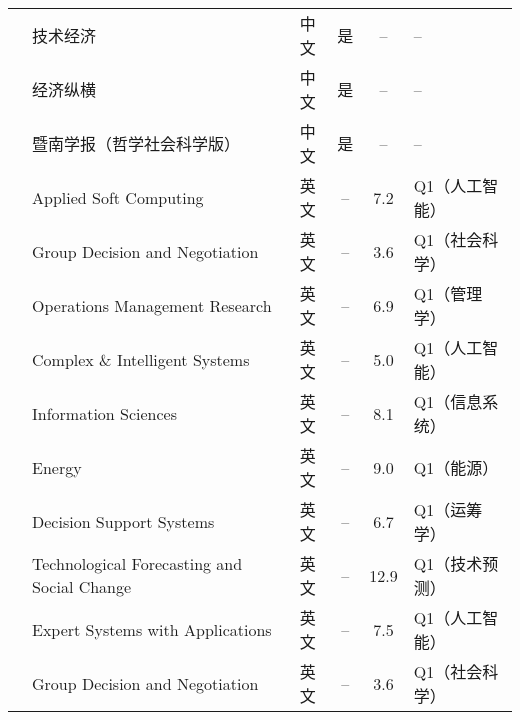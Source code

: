\documentclass[nonblindrev]{write_paper}
\begin{document}
\begin{table}[htbp]
\begin{tabular}{p{1cm}p{7cm}cccl}
\cite{吴继飞2024中国新质生产力发展水平测度、区域差距及动态规律} & 技术经济 & 中文 & 是 & -- & -- \\
\cite{乔晓楠2024新质生产力发展的分析框架：理论机理、测度方法与经验证据} & 经济纵横 & 中文 & 是 & -- & -- \\
\cite{张龙2024新质生产力的原创价值、统计测度与培育方向} & 暨南学报（哲学社会科学版） & 中文 & 是 & -- & -- \\
\cite{ataeiOrdinalPriorityApproach2020} & Applied Soft Computing & 英文 & -- & 7.2 & Q1（人工智能） \\
\cite{mahmoudi2023intervalopa} & Group Decision and Negotiation & 英文 & -- & 3.6 & Q1（社会科学） \\
\cite{mahmoudi2022fuzzyopa} & Operations Management Research & 英文 & -- & 6.9 & Q1（管理学） \\
\cite{abdelbasset2022opa} & Complex \& Intelligent Systems & 英文 & -- & 5.0 & Q1（人工智能） \\
\cite{wang2024popa} & Information Sciences & 英文 & -- & 8.1 & Q1（信息系统） \\
\cite{cui2025carbonopa} & Energy & 英文 & -- & 9.0 & Q1（能源） \\
\cite{pamucar2023opa} & Decision Support Systems & 英文 & -- & 6.7 & Q1（运筹学） \\
\cite{pamucar2022raaopa} & Technological Forecasting and Social Change & 英文 & -- & 12.9 & Q1（技术预测） \\
\cite{mahmoudi2022ropa} & Expert Systems with Applications & 英文 & -- & 7.5 & Q1（人工智能） \\
\cite{mahmoudi2022deaopa} & Group Decision and Negotiation & 英文 & -- & 3.6 & Q1（社会科学） \\
\hline
\end{tabular}
\label{tab:journals}
\end{table}
\end{document}
